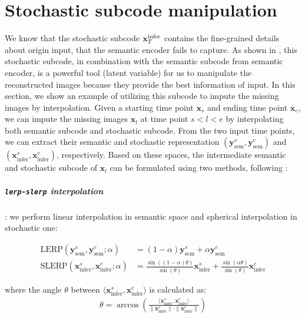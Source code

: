 \chapter{Stochastic subcode manipulation}

We know that the stochastic subcode ${\mathbf{x}}_T^{\text{infer}}$ contains the fine-grained details about origin input, that the semantic encoder fails to capture. As shown in \cite{lozuponeLDAE2025,DiffAE}, this stochastic subcode, in combination with the semantic subcode from semantic encoder, is a powerful tool (latent variable) for us to manipulate the reconstructed images because they provide the best information of input. In this section, we show an example of utilizing this subcode to impute the missing images by interpolation. Given a starting time point $\mathbf{x}_{s}$ and ending time point $\mathbf{x}_{e}$, we can impute the missing images $\mathbf{x}_l$ at time point $s < l < e$ by interpolating both semantic subcode and stochastic subcode. From the two input time points, we can extract their semantic and stochastic representation $(\mathbf{y}_{\text{sem}}^s, \mathbf{y}_{\text{sem}}^e)$ and $(\mathbf{x}_{\text{infer}}^s, \mathbf{x}_{\text{infer}}^e)$, respectively. Based on these spaces, the intermediate semantic and stochastic subcode of $\mathbf{x}_l$ can be formulated using two methods, following \cite{lozuponeLDAE2025}:

\paragraph{\texttt{lerp-slerp} interpolation}: we perform linear interpolation in semantic space and spherical interpolation in stochastic one:

\begin{align*}
  \mathrm{LERP}(\mathbf{y}_{\text{sem}}^s, \mathbf{y}_{\text{sem}}^e; \alpha) &= (1 - \alpha) \mathbf{y}_{\text{sem}}^s + \alpha \mathbf{y}_{\text{sem}}^e \\
  \mathrm{SLERP}(\mathbf{x}_{\text{infer}}^s, \mathbf{x}_{\text{infer}}^e; \alpha) &=
  \frac{\sin((1 - \alpha)\theta)}{\sin(\theta)} \mathbf{x}_{\text{infer}}^s +
  \frac{\sin(\alpha \theta)}{\sin(\theta)} \mathbf{x}_{\text{infer}}^e
\end{align*}

where the angle $\theta$ between $\langle \mathbf{x}_{\text{infer}}^s, \mathbf{x}_{\text{infer}}^e \rangle$ is calculated as: 
\begin{align*}
    \theta = \arccos \left( \frac{\langle \mathbf{x}_{\text{infer}}^s, \mathbf{x}_{\text{infer}}^e \rangle}{\| \mathbf{x}_{\text{infer}}^s \| \cdot \| \mathbf{x}_{\text{infer}}^e \|} \right)
\end{align*}

